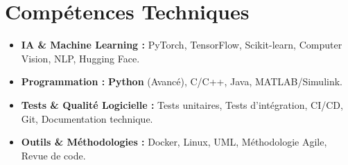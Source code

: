 \documentclass[a4paper,11pt]{article}
\begin{document}
\section{Compétences Techniques}
\begin{itemize}[leftmargin=*, nosep]
    \item \small{\textbf{IA \& Machine Learning :} PyTorch, TensorFlow, Scikit-learn, Computer Vision, NLP, Hugging Face.}
    \item \small{\textbf{Programmation :} \textbf{Python} (Avancé), C/C++, Java, MATLAB/Simulink.}
    \item \small{\textbf{Tests \& Qualité Logicielle :} Tests unitaires, Tests d'intégration, CI/CD, Git, Documentation technique.}
    \item \small{\textbf{Outils \& Méthodologies :} Docker, Linux, UML, Méthodologie Agile, Revue de code.}
\end{itemize}

\end{document}
